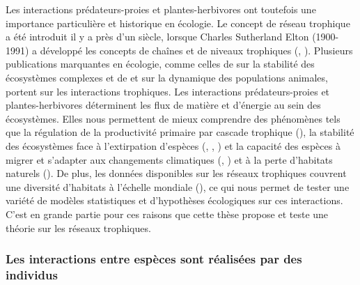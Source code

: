 Les interactions prédateurs-proies et plantes-herbivores ont toutefois une
importance particulière et historique en écologie. Le concept de réseau
trophique a été introduit il y a près d'un siècle, lorsque Charles Sutherland
Elton (1900-1991) a développé les concepts de chaînes et de niveaux trophiques
(\cite{Elton1927Animal}, \cite{Elton1958Ecology}). Plusieurs publications
marquantes en écologie, comme celles de \textcite{May1972Will} sur la stabilité
des écosystèmes complexes et de \textcite{Lotka1925Elements} et
\textcite{Volterra1927Fluctuations} sur la dynamique des populations animales,
portent sur les interactions trophiques. Les interactions prédateurs-proies et
plantes-herbivores déterminent les flux de matière et d'énergie au sein des
écosystèmes. Elles nous permettent de mieux comprendre des phénomènes tels que
la régulation de la productivité primaire par cascade trophique
(\cite{Carpenter1987Regulation}), la stabilité des écosystèmes face à
l'extirpation d'espèces (\cite{Dunne2002Network}, \cite{Srinivasan2007Response},
\cite{Staniczenko2010Structural}) et la capacité des espèces à migrer et
s'adapter aux changements climatiques (\cite{Tylianakis2008Global},
\cite{Gilman2010Framework}) et à la perte d'habitats naturels
(\cite{Evans2013Robustness}). De plus, les données disponibles sur les réseaux
trophiques couvrent une diversité d'habitats à l'échelle mondiale
(\cite{Poisot2021Global}), ce qui nous permet de tester une variété de modèles
statistiques et d'hypothèses écologiques sur ces interactions. C'est en grande
partie pour ces raisons que cette thèse propose et teste une théorie sur les
réseaux trophiques.

\subsubsection{Les interactions entre espèces sont réalisées par des individus} 

